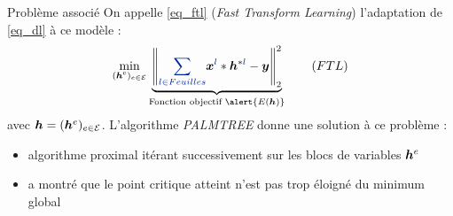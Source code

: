 \begin{frame}{Problème associé}
On appelle \eqref{eq_ftl} (\emph{Fast Transform Learning}) l'adaptation de \eqref{eq_dl} à ce modèle :
\begin{equation*}
\underset{\substack{(\h^\text{e})_{e \in \E}}}\min
	\underbrace{\norm{\Beq{\sum_{l \in Feuilles}} \x^{\Beq{l}} * \h^{*\Beq{l}} -\y}{2}^2}_{\text{Fonction objectif } \alert{E(\h)}} \tag{${FTL}$} \label{eq_ftl}
\end{equation*}
avec $\bm{h} = (\bm{h}^e)_{e \in \mathcal E}$.
L'algorithme \emph{PALMTREE} donne une solution à ce problème :
\begin{itemize}
	\item algorithme proximal itérant successivement sur les blocs de variables $\bm{h}^e$
	\item \cite{chabiron_optimization_2016} a montré que le point  critique atteint n'est pas trop éloigné du minimum global
\end{itemize}
\end{frame}


